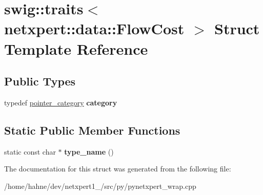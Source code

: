 \hypertarget{structswig_1_1traits_3_01netxpert_1_1data_1_1FlowCost_01_4}{}\section{swig\+:\+:traits$<$ netxpert\+:\+:data\+:\+:Flow\+Cost $>$ Struct Template Reference}
\label{structswig_1_1traits_3_01netxpert_1_1data_1_1FlowCost_01_4}
\subsection*{Public Types}
\begin{DoxyCompactItemize}
\item 
typedef \hyperlink{structswig_1_1pointer__category}{pointer\+\_\+category} {\bfseries category}\hypertarget{structswig_1_1traits_3_01netxpert_1_1data_1_1FlowCost_01_4_ada1fb1f06022e386de721a2764cab5b2}{}\label{structswig_1_1traits_3_01netxpert_1_1data_1_1FlowCost_01_4_ada1fb1f06022e386de721a2764cab5b2}

\end{DoxyCompactItemize}
\subsection*{Static Public Member Functions}
\begin{DoxyCompactItemize}
\item 
static const char $\ast$ {\bfseries type\+\_\+name} ()\hypertarget{structswig_1_1traits_3_01netxpert_1_1data_1_1FlowCost_01_4_aac5298919b02131dc885f1b605ef9a90}{}\label{structswig_1_1traits_3_01netxpert_1_1data_1_1FlowCost_01_4_aac5298919b02131dc885f1b605ef9a90}

\end{DoxyCompactItemize}


The documentation for this struct was generated from the following file\+:\begin{DoxyCompactItemize}
\item 
/home/hahne/dev/netxpert1\+\_/src/py/pynetxpert\+\_\+wrap.\+cpp\end{DoxyCompactItemize}
